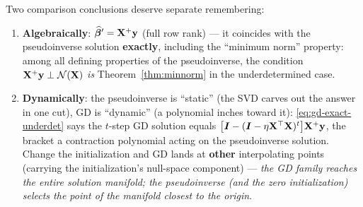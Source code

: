 \begin{center}
\end{center}

Two comparison conclusions deserve separate remembering:

\begin{enumerate}[label=(\arabic*)]
  \item \textbf{Algebraically}: $\widehat{\bm{\beta}}' = \mathbf{X}^+\mathbf{y}$ (full row rank) — it coincides with the pseudoinverse solution \textbf{exactly}, including the ``minimum norm'' property: among all defining properties of the pseudoinverse, the condition $\mathbf{X}^+\mathbf{y} \perp \mathcal{N}(\mathbf{X})$ \emph{is} Theorem~\ref{thm:minnorm} in the underdetermined case.
  \item \textbf{Dynamically}: the pseudoinverse is ``static'' (the SVD carves out the answer in one cut), GD is ``dynamic'' (a polynomial inches toward it): \eqref{eq:gd-exact-underdet} says the $t$-step GD solution equals $\big[\bm{I} - (\bm{I} - \eta\mathbf{X}^\top\mathbf{X})^t\big]\mathbf{X}^+\mathbf{y}$, the bracket a contraction polynomial acting on the pseudoinverse solution. Change the initialization and GD lands at \textbf{other} interpolating points (carrying the initialization's null-space component) — \textit{the GD family reaches the entire solution manifold; the pseudoinverse (and the zero initialization) selects the point of the manifold closest to the origin}.
\end{enumerate}

